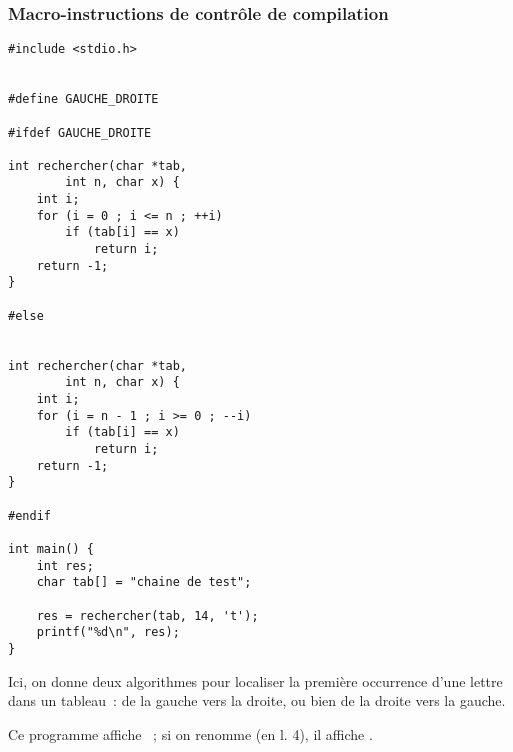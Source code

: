 \begin{frame}[fragile] 
\frametitle{Macro-instructions de contrôle de compilation}
\begin{multicols}{2}
\begin{lstlisting}[basicstyle=\ttfamily\scriptsize]
#include <stdio.h>


#define GAUCHE_DROITE

#ifdef GAUCHE_DROITE

int rechercher(char *tab, 
        int n, char x) {
    int i;
    for (i = 0 ; i <= n ; ++i)
        if (tab[i] == x)
            return i;
    return -1;
}

#else


int rechercher(char *tab, 
        int n, char x) {
    int i;
    for (i = n - 1 ; i >= 0 ; --i)
        if (tab[i] == x)
            return i;
    return -1;
}

#endif

int main() {
    int res;
    char tab[] = "chaine de test";
    
    res = rechercher(tab, 14, 't');
    printf("%d\n", res);
}
\end{lstlisting}
\end{multicols}

\begin{footnotesize}
Ici, on donne deux algorithmes pour localiser la première occurrence
d'une lettre dans un tableau~: de la gauche vers la droite, ou bien
de la droite vers la gauche.
\smallskip

Ce programme affiche ~; si on renomme 
(en l. 4), il affiche .
\end{footnotesize}
\end{frame}
